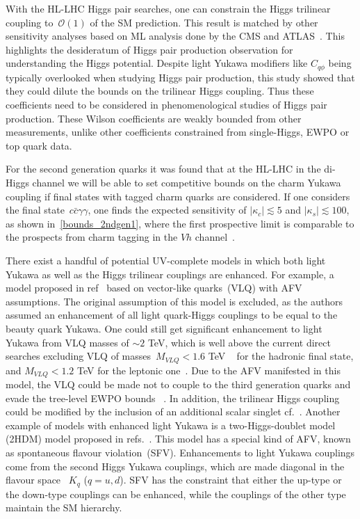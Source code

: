 \par With the HL-LHC Higgs pair searches, one can constrain the Higgs trilinear coupling to~$\mathcal{O}(1)$ of the SM prediction. This result is matched by other sensitivity analyses based on ML analysis done by the CMS and ATLAS~\cite{ATL-PHYS-PUB-2018-053,ATLAS:2018rvj,CMS-PAS-FTR-18-011}. This highlights the desideratum of Higgs pair production observation for understanding the Higgs potential. Despite light Yukawa modifiers like $C_{q\phi}$ being typically overlooked when studying Higgs pair production, this study showed that they could dilute the bounds on the trilinear Higgs coupling. Thus these coefficients need to be considered in phenomenological studies of Higgs pair production. These Wilson coefficients are weakly bounded from other measurements, unlike other coefficients constrained from single-Higgs, EWPO or top quark data. 
\par For the second generation quarks it was found that at the HL-LHC in the di-Higgs channel we will be able to set competitive bounds on the
charm Yukawa coupling if final states with tagged charm quarks are considered.
If one considers the final state~$c\bar{c}\gamma\gamma$, one finds the expected sensitivity of $|\kappa_c| \lesssim 5$ and $|\kappa_s | \lesssim 100 $, as shown in~\autoref{bounds_2ndgen1}, where the first prospective limit is comparable to the prospects from charm tagging in the $Vh$ channel~\cite{Perez:2015lra}.
\par There exist a handful of potential UV-complete models in which both light Yukawa as well as the Higgs trilinear couplings are enhanced. For example, a model proposed in ref~\cite{Bar-Shalom:2018rjs} based on vector-like quarks~(VLQ) with AFV assumptions. The original assumption of this model is excluded, as the authors assumed an enhancement of all light quark-Higgs couplings to be equal to the beauty quark Yukawa. One could still get significant enhancement to light Yukawa from VLQ masses of $ \sim 2$ TeV, which is well above the current direct searches excluding VLQ of masses~$ M_{VLQ} < 1.6$ TeV ~\cite{Unal:2777832,CMS:2019eqb} for the hadronic final state, and $M_{VLQ}< 1.2$ TeV for the leptonic one~\cite{CMS:2018wpl}. Due to the AFV manifested in this model, the VLQ could be made not to couple to the third generation quarks and evade the tree-level EWPO bounds ~\cite{Dawson:2020oco}. In addition, the trilinear Higgs coupling could be modified by the inclusion of an additional scalar singlet cf.~\cite{DiLuzio:2017tfn, Falkowski:2019tft, Chang:2019vez}.  Another example of models with enhanced light Yukawa is a two-Higgs-doublet model (2HDM) model proposed in refs.~\cite{Egana-Ugrinovic:2019dqu,Egana-Ugrinovic:2021uew}. This model has a special kind of AFV, known as spontaneous flavour violation~(SFV).  Enhancements to light Yukawa couplings come from the second Higgs Yukawa couplings, which are made diagonal in the flavour space ~$K_{q}$ ($q=u,d$). SFV has the constraint that either the up-type or the down-type couplings can be enhanced, while the couplings of the other type maintain the SM hierarchy. 
